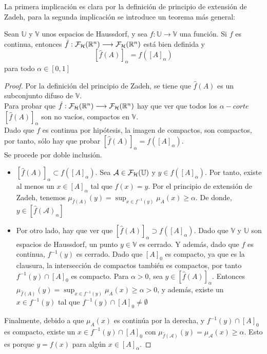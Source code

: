   La primera implicación es clara por la definición de principio de extensión de Zadeh, para la segunda implicación se introduce un teorema más general:


  \begin{teorema}
    Sean $\mathbb{U}$ y $\mathbb{V}$ unos espacios de Haussdorf, y sea $f: \mathbb{U} \longrightarrow \mathbb{V}$ una función. Si $f$ es continua, entonces  $\hat{f} : \mathcal{F}_\mathcal{H}(\mathbb R^n) \longrightarrow \mathcal{F}_\mathcal{H}(\mathbb R^n)$ está bien definida y $$[\hat{f}(A)]_\alpha = f([A]_\alpha)$$
    para todo $\alpha \in [0, 1]$
  \end{teorema}

  \begin{proof}
    Por la definición del principio de Zadeh, se tiene que $\hat{f}(A)$ es un subconjunto difuso de $\mathbb{V}$. \\
    Para probar que $\hat{f} : \mathcal{F}_\mathcal{H}(\mathbb R^n) \longrightarrow \mathcal{F}_\mathcal{H}(\mathbb R^n)$ hay que ver que todos los $\alpha-corte$ $[\hat{f}(A)]_\alpha$ son no vacíos, compactos en $\mathbb{V}$. \\
    Dado que $f$ es continua por hipótesis, la imagen de compactos, son compactos, por tanto, sólo hay que probar $[\hat{f}(A)]_\alpha = f([A]_\alpha)$. \\
    Se procede por doble inclusión.
    
    \begin{itemize}
    \item $[\hat{f}(A)]_\alpha \subset f([A]_\alpha)$. Sea $\mathcal{A} \in \mathcal{F}_\mathcal{H}(\mathbb U)$ y $y \in f([A]_\alpha)$. Por tanto, existe al menos un $x \in [A]_\alpha$ tal que $f(x)=y$. Por el principio de extensión de Zadeh, tenemos $\mu_{\hat{f}(A)}(y)=\sup_{x\in f^{-1}(y)} \mu_A(x) \geq \alpha$. De donde, $y \in [\hat{f}(\mathcal{A})_\alpha]$
    \item Por otro lado, hay que ver que $[\hat{f}(A)]_\alpha \supset f([A]_\alpha)$. Dado que $\mathbb{V}$ y $\mathbb{U}$ son espacios de Haussdorf, un punto $y \in \mathbb{V}$ es cerrado. Y además, dado que $f$ es continua, $f^{-1}(y)$ es cerrado. Dado que $[A]_0$ es compacto, ya que es la clausura, la intersección de compactos también es compactos, por tanto $f^{-1}(y) \cap [A]_0$ es compacto. Para $\alpha>0$, sea $y \in [\hat{f}(A)]_\alpha$. Entonces $\mu_{\hat{f}(A)}(y)=\sup_{x\in f^{-1}(y)} \mu_A(x) \geq \alpha>0$, y además, existe un $x\in f^{-1}(y)$ tal que $f^{-1}(y) \cap [A]_0 \neq \emptyset$
    \end{itemize}
    Finalmente, debido a que $\mu_A(x)$ es continúa por la derecha, y $f^{-1}(y) \cap [A]_0$ es compacto, existe un $x \in f^{-1}(y) \cap [A]_0$ con $\mu_{\hat{f}(\mathcal{A})}(y)=\mu_{\mathcal{A}}(x) \geq \alpha$. Esto es porque $y=f(x)$ para algún $x \in [A]_\alpha$.
    

\end{proof}
